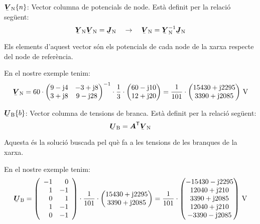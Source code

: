 \begin{list}{}
   \item[$\mcmplx{V}\ped{N}\{n\}$:] Vector columna de potencials de node. Est\`{a} definit per la relaci\'{o} seg\"{u}ent:
   \begin{equation}
      \mcmplx{Y}\ped{N} \mcmplx{V}\ped{N} = \mcmplx{J}\ped{N} \quad\rightarrow\quad
      \mcmplx{V}\ped{N} = \mcmplx{Y}\ped{N}^{-1} \mcmplx{J}\ped{N} \label{eq:vn}
   \end{equation}

   Els elements d'aquest vector s\'{o}n els potencials de cada node de la xarxa respecte del node de refer\`{e}ncia.

   En el nostre exemple tenim:
   \[
      \mcmplx{V}\ped{N} = 60 \cdot
      \begin{pmatrix}
            9 - \ju 4 & -3 + \ju 8 \\
            3 + \ju 8 & 9 - \ju 28
      \end{pmatrix} ^{-1} \cdot
      \frac{1}{3} \cdot \begin{pmatrix}
            60 - \ju 10 \\
            12 + \ju 20
      \end{pmatrix}
      =
      \frac{1}{101} \cdot \begin{pmatrix}
            15430 + \ju 2295 \\
            3390 + \ju 2085
      \end{pmatrix}\unit{V}
      \label{eq:vn_exemp}
   \]

   \item[$\mcmplx{U}\ped{B}\{b\}$:] Vector columna de tensions de branca. Est\`{a} definit per la relaci\'{o} seg\"{u}ent:
   \begin{equation}
      \mcmplx{U}\ped{B} = \transp{\boldsymbol{A}} \mcmplx{V}\ped{N} \label{eq:ur}
   \end{equation}

   Aquesta \'{e}s la soluci\'{o} buscada pel qu\`{e} fa a les tensions de les branques de la xarxa.

   En el nostre exemple tenim:
   \[
      \mcmplx{U}\ped{B} =
      \left(\begin{array}{rr} -1 & 0 \\ 1  & -1 \\  0 & 1 \\ 1 & -1 \\ 0 & -1
      \end{array}\right) \cdot
      \frac{1}{101} \cdot \begin{pmatrix}
            15430 + \ju 2295 \\
            3390 + \ju 2085
      \end{pmatrix} =
      \frac{1}{101} \cdot \begin{pmatrix}
            -15430 - \ju 2295 \\
            12040 + \ju 210  \\
            3390 + \ju 2085 \\
            12040 + \ju 210  \\
            -3390 - \ju 2085
      \end{pmatrix}\unit{V}
   \]


\end{list}
